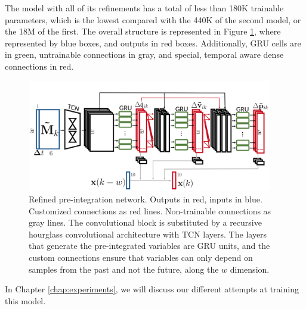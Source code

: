 The model with all of its refinements has a total of less than 180K trainable parameters, which is the lowest compared with the 440K of the second model, or the 18M of the first.
The overall structure is represented in Figure \ref{fig:full_pre_integration_model}, where represented by blue boxes, and outputs in red boxes.
Additionally, GRU cells are in green, untrainable connections in gray, and special, temporal aware dense connections in red.

\begin{figure}[h]
   \centering
   \includegraphics[width=0.95\textwidth]{thesis_template/img/pre_integration_full.png}
   \caption{Refined pre-integration network. Outputs in red, inputs in blue. Customized connections as red lines. Non-trainable connections as gray lines.
   The convolutional block is substituted by a recursive hourglass convolutional architecture with TCN layers.
   The layers that generate the pre-integrated variables are GRU units, and the custom connections ensure that variables can only depend on samples from the past and not the future, along the $w$ dimension.}
   \label{fig:full_pre_integration_model}
\end{figure}

In Chapter \ref{chap:experiments}, we will discuss our different attempts at training this model.